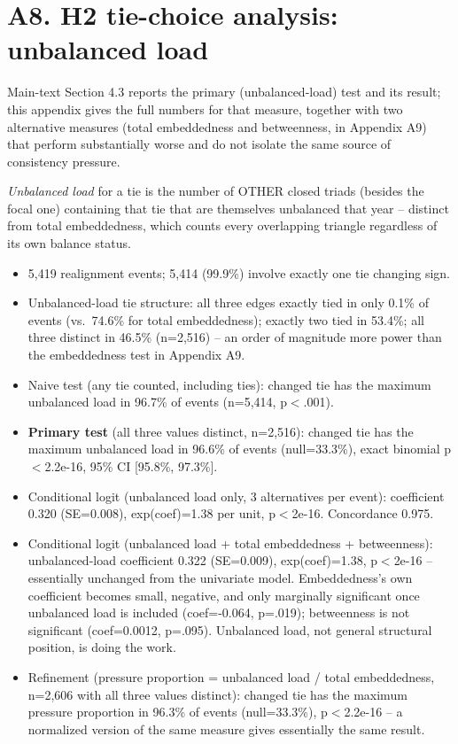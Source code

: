 \documentclass[Afour,sageh,times,doublespace]{sagej}
\begin{document}
\section*{A8. H2 tie-choice analysis: unbalanced load}

Main-text Section 4.3 reports the primary (unbalanced-load) test and its result; this appendix gives the full numbers for that measure, together with two alternative measures (total embeddedness and betweenness, in Appendix A9) that perform substantially worse and do not isolate the same source of consistency pressure.

\emph{Unbalanced load} for a tie is the number of OTHER closed triads (besides the focal one) containing that tie that are themselves unbalanced that year -- distinct from total embeddedness, which counts every overlapping triangle regardless of its own balance status.

\begin{itemize}
\item 5,419 realignment events; 5,414 (99.9\%) involve exactly one tie changing sign.
\item Unbalanced-load tie structure: all three edges exactly tied in only 0.1\% of events (vs.\ 74.6\% for total embeddedness); exactly two tied in 53.4\%; all three distinct in 46.5\% (n=2,516) -- an order of magnitude more power than the embeddedness test in Appendix A9.
\item Naive test (any tie counted, including ties): changed tie has the maximum unbalanced load in 96.7\% of events (n=5,414, p$<$.001).
\item \textbf{Primary test} (all three values distinct, n=2,516): changed tie has the maximum unbalanced load in 96.6\% of events (null=33.3\%), exact binomial p$<$2.2e-16, 95\% CI [95.8\%, 97.3\%].
\item Conditional logit (unbalanced load only, 3 alternatives per event): coefficient 0.320 (SE=0.008), exp(coef)=1.38 per unit, p$<$2e-16. Concordance 0.975.
\item Conditional logit (unbalanced load + total embeddedness + betweenness): unbalanced-load coefficient 0.322 (SE=0.009), exp(coef)=1.38, p$<$2e-16 -- essentially unchanged from the univariate model. Embeddedness's own coefficient becomes small, negative, and only marginally significant once unbalanced load is included (coef=-0.064, p=.019); betweenness is not significant (coef=0.0012, p=.095). Unbalanced load, not general structural position, is doing the work.
\item Refinement (pressure proportion = unbalanced load / total embeddedness, n=2,606 with all three values distinct): changed tie has the maximum pressure proportion in 96.3\% of events (null=33.3\%), p$<$2.2e-16 -- a normalized version of the same measure gives essentially the same result.
\end{itemize}
\end{document}
